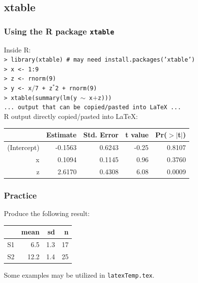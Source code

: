 \documentclass[slidestop,compress,mathserif]{beamer}
\begin{document}
\subsection[xtable]{xtable}
\begin{frame} \frametitle{Using the R package \texttt{xtable}} 
	Inside R: \\
	\vspace{0.3cm} \small
	\hspace{0.3cm}\texttt{> library(xtable) \# may need install.packages('xtable')} \\
	\hspace{0.3cm}\texttt{> x <- 1:9} \\
	\hspace{0.3cm}\texttt{> z <- rnorm(9)} \\
	\hspace{0.3cm}\texttt{> y <- x$/$7 + z$^*$2 + rnorm(9)} \\
	\hspace{0.3cm}\texttt{> xtable(summary(lm(y $\sim$ x$+$z)))} \\
	\hspace{0.3cm}\texttt{... output that can be copied/pasted into LaTeX ...} \\
	\vspace{0.3cm} \normalsize
	R output directly copied/pasted into LaTeX:
	\begin{table}[ht]
		\begin{center}
			\begin{tabular}{rrrrr}
				\hline
				& Estimate & Std. Error & t value & Pr($>$$|$t$|$) \\
				\hline
				(Intercept) & -0.1563 & 0.6243 & -0.25 & 0.8107 \\
				x & 0.1094 & 0.1145 & 0.96 & 0.3760 \\
				z & 2.6170 & 0.4308 & 6.08 & 0.0009 \\
				\hline
			\end{tabular}
		\end{center}
	\end{table}
\end{frame}

\begin{frame} \frametitle{Practice}
	
	Produce the following result:
	\begin{center}
		\begin{tabular}{l rrr}
			\hline
			& mean & sd & n \\
			\hline
			S1 & 6.5 & 1.3 & 17 \\
			S2 & 12.2 & 1.4 & 25 \\
			\hline
		\end{tabular}
	\end{center}
	
	Some examples may be utilized in \texttt{\color{highlight}latexTemp.tex}.
	
\end{frame}
\end{document}
